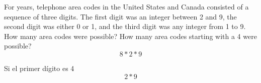 \item For years, telephone area codes in the United States and Canada consisted of a sequence of three digits. The first digit was an integer between 2 and 9, the second digit was either 0 or 1, and the third digit was any integer from 1 to 9. How many area codes were possible? How many area codes starting with a 4 were possible?
\[ 8 * 2 * 9 \]

Si el primer dígito es 4
\[ 2 * 9 \]